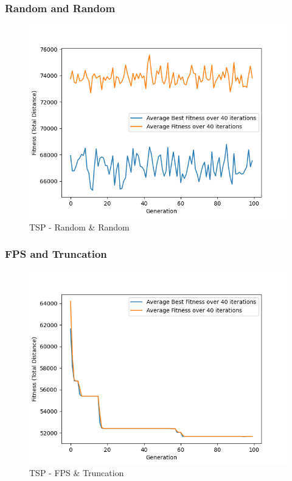 \documentclass[11pt, letterpaper]{article}
\begin{document}
\subsubsection {Random and Random}
\begin{figure}[H]
    \centering
    \includegraphics[scale = 0.6]{images/tsp_rd_rd.png}
    \caption {TSP - Random \& Random}
    \label {fig:tpsRR}
\end{figure}
\subsubsection {FPS and Truncation}
\begin{figure}[H]
    \centering
    \includegraphics[scale = 0.6]{images/tsp_fp_tr.png}
    \caption {TSP - FPS \& Truncation}
    \label {fig:tpsFT}
\end{figure}
\end{document}
